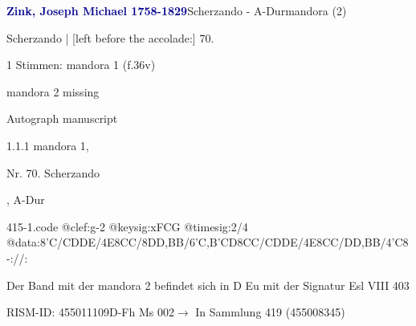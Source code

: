 \documentclass[twocolumn, 12pt]{book}
\begin{document}
\par \vspace{16pt} \textcolor{darkblue}{\textbf{Zink, Joseph Michael  1758-1829}}\hfillplus{\textbf{[415]}}\newline Scherzando - A-Dur\newline mandora (2)
\par \begin{itshape}[f.36v, at left:] Scherzando | [left before the accolade:] 70.\end{itshape} 
\par \textcolor{darkblue}{}  1 Stimmen: mandora 1  (f.36v)\newline \begin{small} mandora 2 missing\end{small} \newline Autograph manuscript
\par 1.1.1  mandora 1, \begin{itshape}Nr. 70. Scherzando\end{itshape}, A-Dur  
\begin{filecontents*}{415-1.code}
@clef:g-2
@keysig:xFCG
@timesig:2/4
@data:8'C/CDDE/4E{8CC}/8DD,BB/{6'C,B'CD}{8CC}/CDDE/4E{8CC}/DD,BB/4'C8-://:
\end{filecontents*}
\newline %
\par Der Band mit der mandora 2 befindet sich in D Eu mit der Signatur Esl VIII 403
\par RISM-ID: 455011109\newline D-Fh  Ms 002\newline $\rightarrow$ In Sammlung 419 (455008345)
      
\end{document}
